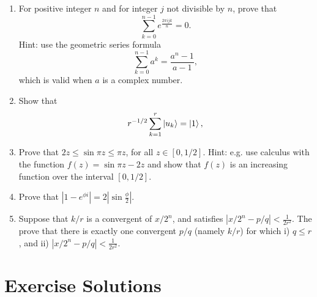 \documentclass [12pt]{article}
\theoremstyle{definition}
\begin{document}
\begin{enumerate}
\item 
\label{exercise:sum}
For positive integer $n$ and for integer $j$ not divisible by $n$, prove that
\[\overset{n-1}{\underset{k=0}{\sum}}e^{\frac{2\pi ijk}{n}}=0.\]
Hint: use the geometric series formula
\[\overset{n-1}{\underset{k=0}{\sum}}a^{k}=\frac{a^{n}-1}{a-1},\]
which is valid when $a$ is a complex number.
 
 \item Show that \[r^{-1/2}\sum_{k=1}^r\ket{u_k} = \ket{1},\]
  

\item  Prove that $2z \leq \sin\pi z \leq \pi z$, for all $z\in[0,1/2]$. Hint: e.g. use calculus with the function $f(z) = \sin\pi z - 2z$ and show that $f(z)$ is an increasing 
function over the interval $[0,1/2]$.

\item Prove that $|1-e^{\phi i}| = 2|\sin\frac{\phi}{2}|$.

\item Suppose that $k/r$ is a convergent of $x/2^n$, and satisfies $|x/2^n-p/q| < \frac{1}{2r^2}$. The prove that there is exactly one convergent $p/q$ (namely $k/r$) for which
 i) $q \leq r$, and ii) 
$|x/2^n-p/q| < \frac{1}{2r^2}$. 
 






    

\end{enumerate}




\newpage
\section*{Exercise Solutions}
\end{document}
